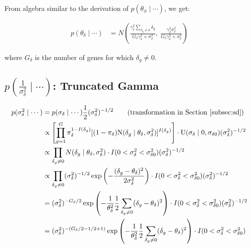 \documentclass{article}\usepackage{graphicx, color}
\begin{document}
\begin{flushleft}
From algebra similar to the derivation of $p(\theta_\phi \mid \cdots)$, we get:

\begin{align*}
p(\theta_\delta \mid \cdots) &= N \left ( \frac{\gamma_\delta^2 \sum_{\delta_g \ne 0} \delta_g}{G_\delta \gamma_\delta^2 + \sigma_\delta^2}, \ \frac{\gamma_\delta^2 \sigma_\delta^2}{G_\delta \gamma_\delta^2 + \sigma_\delta^2} \right ) 
\end{align*}

where $G_\delta$ is the number of genes for which $\delta_g \ne 0$.









\subsection{$p \left (\frac{1}{\sigma_\delta^2} \mid \cdots  \right )$: Truncated Gamma}

\begin{align*}
p(\sigma_\delta^2 \mid \cdots ) & = p(\sigma_\delta \mid \cdots) \frac{1}{2} (\sigma_\delta^2)^{-1/2} \qquad \text{(transformation in Section \ref{subsec:sd})} \\
&\propto \left [ \prod_{g = 1}^G  \pi_\delta^{1-I(\delta_g)}[(1- \pi_\delta)\text{N}(\delta_g \mid \theta_\delta, \sigma_\delta^2)]^{I(\delta_g)} \right ]  \cdot \text{U}(\sigma_\delta \mid 0, \sigma_{\delta 0})  (\sigma_\delta^2)^{-1/2} \\
&\propto \prod_{\delta_g \ne 0} N(\delta_g \mid \theta_\delta, \sigma_\delta^2) \cdot I(0 < \sigma_\delta^2 < \sigma_{\delta 0}^2 )  (\sigma_\delta^2)^{-1/2} \\
&\propto \prod_{\delta_g \ne 0} (\sigma_\delta^2)^{-1/2} \exp \left ( -\frac{(\delta_g - \theta_\delta)^2}{2 \sigma_\delta^2}\right ) \cdot I(0 < \sigma_\delta^2 < \sigma_{\delta 0}^2 )  (\sigma_\delta^2)^{-1/2} \\
&= (\sigma_\delta^2)^{-G_\delta/2} \exp \left ( -\frac{1}{\theta_\delta^2} \frac{1}{2} \sum_{\delta_g \ne 0} (\delta_g - \theta_\delta)^2 \right ) \cdot I(0 < \sigma_\delta^2 < \sigma_{\delta 0}^2 )  (\sigma_\delta^2)^{-1/2} \\
&= (\sigma_\delta^2)^{-(G_\delta/2 -1 /2 + 1)} \exp \left ( -\frac{1}{\theta_\delta^2} \frac{1}{2} \sum_{\delta_g \ne 0} (\delta_g - \theta_\delta)^2 \right ) \cdot I(0 < \sigma_\delta^2 < \sigma_{\delta 0}^2 ) \\
\end{align*}


\end{flushleft}
\end{document}
